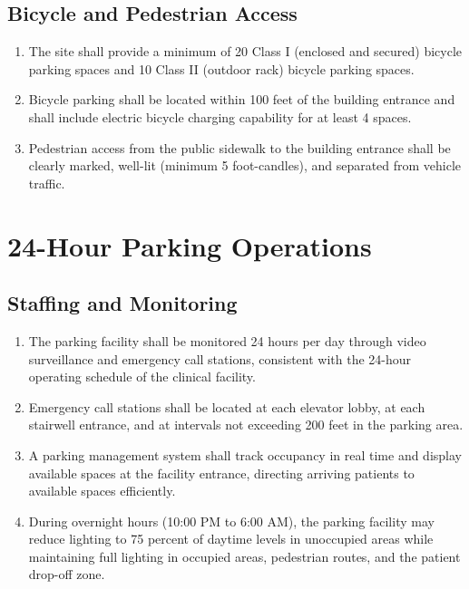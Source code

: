 \documentclass[11pt,letterpaper]{article}
\begin{document}
\subsection{Bicycle and Pedestrian Access}

\begin{enumerate}[label=(\alph*)]
\item The site shall provide a minimum of 20 Class I (enclosed and secured)
  bicycle parking spaces and 10 Class II (outdoor rack) bicycle parking spaces.

\item Bicycle parking shall be located within 100 feet of the building entrance
  and shall include electric bicycle charging capability for at least 4 spaces.

\item Pedestrian access from the public sidewalk to the building entrance shall
  be clearly marked, well-lit (minimum 5 foot-candles), and separated from
  vehicle traffic.
\end{enumerate}

\section{24-Hour Parking Operations}

\subsection{Staffing and Monitoring}

\begin{enumerate}[label=(\alph*)]
\item The parking facility shall be monitored 24 hours per day through video
  surveillance and emergency call stations, consistent with the 24-hour
  operating schedule of the clinical facility.

\item Emergency call stations shall be located at each elevator lobby, at each
  stairwell entrance, and at intervals not exceeding 200 feet in the parking
  area.

\item A parking management system shall track occupancy in real time and display
  available spaces at the facility entrance, directing arriving patients to
  available spaces efficiently.

\item During overnight hours (10:00 PM to 6:00 AM), the parking facility may
  reduce lighting to 75 percent of daytime levels in unoccupied areas while
  maintaining full lighting in occupied areas, pedestrian routes, and the
  patient drop-off zone.
\end{enumerate}
\end{document}
